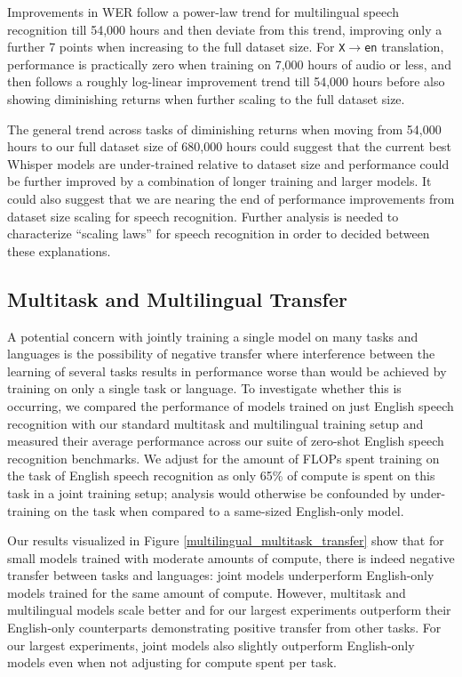 Improvements in WER follow a power-law trend for multilingual speech recognition till 54,000 hours and then deviate from this trend, improving only a further 7 points when increasing to the full dataset size. For \texttt{X$\rightarrow$en} translation, performance is practically zero when training on 7,000 hours of audio or less, and then follows a roughly log-linear improvement trend till 54,000 hours before also showing diminishing returns when further scaling to the full dataset size.

The general trend across tasks of diminishing returns when moving from 54,000 hours to our full dataset size of 680,000 hours could suggest that the current best Whisper models are under-trained relative to dataset size and performance could be further improved by a combination of longer training and larger models. It could also suggest that we are nearing the end of performance improvements from dataset size scaling for speech recognition. Further analysis is needed to characterize ``scaling laws'' for speech recognition in order to decided between these explanations.

\subsection{Multitask and Multilingual Transfer}

A potential concern with jointly training a single model on many tasks and languages is the possibility of negative transfer where interference between the learning of several tasks results in performance worse than would be achieved by training on only a single task or language. To investigate whether this is occurring, we compared the performance of models trained on just English speech recognition with our standard multitask and multilingual training setup and measured their average performance across our suite of zero-shot English speech recognition benchmarks. We adjust for the amount of FLOPs spent training on the task of English speech recognition as only 65\% of compute is spent on this task in a joint training setup; analysis would otherwise be confounded by under-training on the task when compared to a same-sized English-only model.

Our results visualized in Figure \ref{multilingual_multitask_transfer} show that for small models trained with moderate amounts of compute, there is indeed negative transfer between tasks and languages: joint models underperform English-only models trained for the same amount of compute. However, multitask and multilingual models scale better and for our largest experiments outperform their English-only counterparts demonstrating positive transfer from other tasks. For our largest experiments, joint models also slightly outperform English-only models even when not adjusting for compute spent per task.

